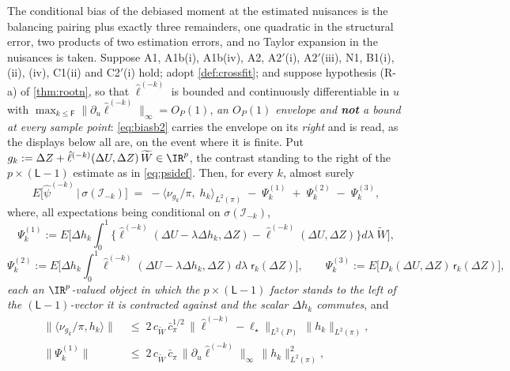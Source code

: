 \begin{lemma}\label{lem:biasexp}
The conditional bias of the debiased moment at the estimated nuisances is the balancing pairing plus exactly
three remainders, one quadratic in the structural error, two products of two estimation errors, and no
Taylor expansion in the nuisances is taken.
Suppose A1, A1b(i), A1b(iv), A2, A$2'$(i), A$2'$(iii), N1, B1(i), (ii), (iv), C1(ii) and C2$'$(i) hold;
adopt \cref{def:crossfit}; and suppose hypothesis (R-a) of \cref{thm:rootn}, so that $\hat\ell^{(-k)}$ is
bounded and continuously differentiable in $u$ with
$\max_{k\le\mathsf F}\|\partial_u\hat\ell^{(-k)}\|_\infty=O_P(1)$, \emph{an $O_P(1)$ envelope and
\textbf{not} a bound at every sample point}: \eqref{eq:biasb2}
carries the envelope on its \emph{right} and is read, as the displays below all are, on the event where
it is finite. Put $g_k:=\Delta Z+\hat\ell^{(-k)}(\Delta U,\Delta Z)\,\widetilde W\in\IR^{p}$, the contrast
standing to the right of the $p\times(\mathsf L-1)$ estimate as in \eqref{eq:psidef}. Then, for every $k$, almost
surely
\begin{equation}\label{eq:biasdecomp}
E\big[\hat\psi^{(-k)}\,\big|\,\sigma(\mathcal I_{-k})\big]
\;=\;-\big\langle\nu_{g_k}/\pi,\;h_k\big\rangle_{L^{2}(\pi)}
\;-\;\Psi^{(1)}_k\;+\;\Psi^{(2)}_k\;-\;\Psi^{(3)}_k ,
\end{equation}
where, all expectations being conditional on $\sigma(\mathcal I_{-k})$,
\[
\Psi^{(1)}_k:=E\Big[\Delta h_k\!\int_0^1\!\big\{\hat\ell^{(-k)}(\Delta U-\lambda\Delta h_k,\Delta Z)-\hat\ell^{(-k)}(\Delta U,\Delta Z)\big\}d\lambda\;\widetilde W\Big],
\]
\[
\Psi^{(2)}_k:=E\Big[\Delta h_k\!\int_0^1\!\hat\ell^{(-k)}(\Delta U-\lambda\Delta h_k,\Delta Z)\,d\lambda\;\mathsf r_k(\Delta Z)\Big],
\qquad
\Psi^{(3)}_k:=E\big[D_k(\Delta U,\Delta Z)\,\mathsf r_k(\Delta Z)\big] ,
\]
\emph{each an $\IR^{p}$-valued object in which the $p\times(\mathsf L-1)$ factor stands to the left of
the $(\mathsf L-1)$-vector it is contracted against and the scalar $\Delta h_k$ commutes}, and
\begin{align}
\big\|\big\langle\nu_{g_k}/\pi,h_k\big\rangle\big\|
&\;\le\;2\,c_{\widetilde W}\,\bar c_\pi^{1/2}\,\big\|\hat\ell^{(-k)}-\ell_\star\big\|_{L^{2}(P)}\,\big\|h_k\big\|_{L^{2}(\pi)},
\label{eq:biasb1}\\
\big\|\Psi^{(1)}_k\big\|&\;\le\;2\,c_{\widetilde W}\,\bar c_\pi\,\big\|\partial_u\hat\ell^{(-k)}\big\|_\infty\,\big\|h_k\big\|^{2}_{L^{2}(\pi)},

\end{align}
\end{lemma}
